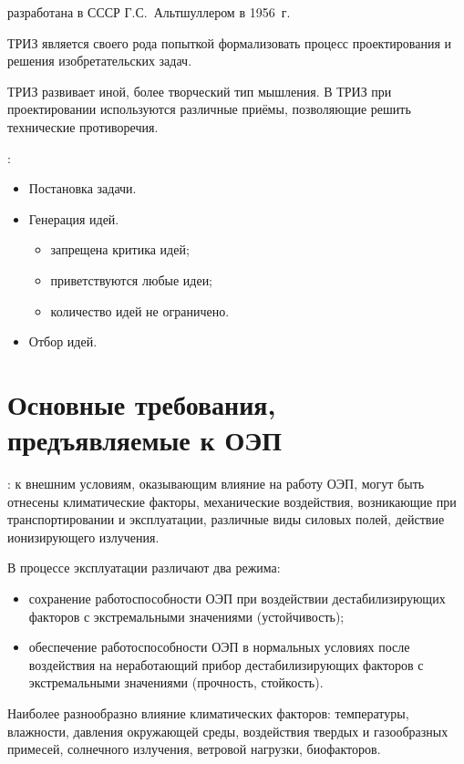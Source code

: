  разработана в СССР Г.С.~Альтшуллером в 1956~г. 

ТРИЗ является своего рода попыткой формализовать процесс проектирования и решения изобретательских задач. 

ТРИЗ развивает иной, более творческий тип мышления.
В ТРИЗ при проектировании используются различные приёмы, позволяющие решить технические противоречия.

:
\begin{itemize}
	\item Постановка задачи.
	\item Генерация идей.
	\begin{itemize}
		\item запрещена критика идей;
		\item приветствуются любые идеи;
		\item количество идей не ограничено.
	\end{itemize}
	\item Отбор идей.
\end{itemize}


\section{Основные требования, предъявляемые к ОЭП}

: к внешним условиям, оказывающим влияние на работу ОЭП, могут быть отнесены климатические факторы, механические воздействия, возникающие при транспортировании и эксплуатации, различные виды силовых полей, действие ионизирующего излучения.

В процессе эксплуатации различают два режима:
\begin{itemize}
	\item сохранение работоспособности ОЭП при воздействии дестабилизирующих факторов с экстремальными значениями (устойчивость);
	\item обеспечение работоспособности ОЭП в нормальных условиях после воздействия на неработающий прибор дестабилизирующих факторов с экстремальными значениями (прочность, стойкость).
\end{itemize}

Наиболее разнообразно влияние климатических факторов: температуры, влажности, давления окружающей среды, воздействия твердых и газообразных примесей, солнечного излучения, ветровой нагрузки, биофакторов.

